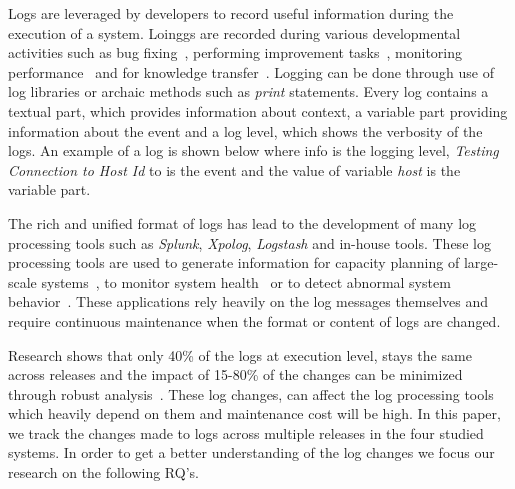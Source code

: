 Logs are leveraged by developers to record useful information during the execution of a system. Loinggs are recorded during various developmental activities such as bug fixing~\cite{ConsoleLogs,JGLouMining,QFuanomaly}, performing improvement tasks~\cite{Automatic}, monitoring performance~\cite{Yuan} and for knowledge transfer~\cite{IanWCRE}.
Logging can be done through use of log libraries or archaic methods such as \textsl{print} statements. Every log contains a textual part, which provides information about context, a variable part providing information about the event and a log level, which shows the verbosity of the logs. An example of a log is shown below where info is the logging level, \textsl{Testing Connection to Host Id} to is the event and the value of variable \textsl{host} is the variable part.

The rich  and unified format of logs has lead to the development of many log processing tools such as \textsl{Splunk}, \textsl{Xpolog}, \textsl{Logstash} and in-house tools. These log processing tools are used to generate information for capacity planning of large-scale systems~\cite{hassan2008industrial,nagappan2009efficiently}, to monitor system health~\cite{bitincka2010optimizing} or to detect abnormal system behavior~\cite{JiangICSM2008}. These applications rely heavily on the log messages themselves and require continuous maintenance when the format or content of logs are changed. 


Research shows that only 40\% of the logs at execution level, stays the same across releases and the impact of 15-80\% of the changes can be minimized through robust analysis~\cite{IanWCRE}. These log changes, can affect the log processing tools which heavily depend on them and maintenance cost will be high. In this paper, we track the changes made to logs across multiple releases in the four studied systems. In order to get a better understanding of the log changes we focus our research on the following RQ's.

